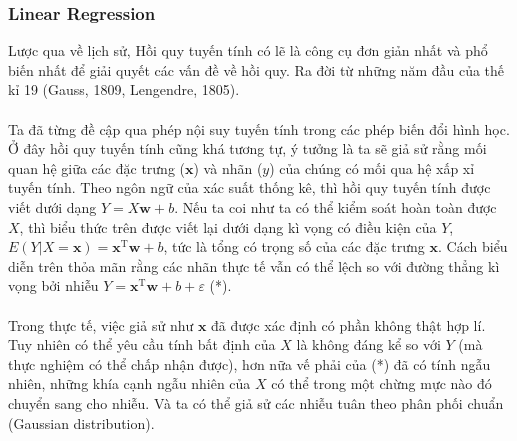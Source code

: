 \documentclass{article}
\begin{document}
\subsubsection{Linear Regression}
Lược qua về lịch sử, Hồi quy tuyến tính có lẽ là công cụ đơn giản nhất và phổ biến nhất để giải quyết các vấn đề về hồi quy. Ra đời từ những năm đầu của thế kỉ 19 (Gauss, 1809, Lengendre, 1805).\\\\
Ta đã từng đề cập qua phép nội suy tuyến tính trong các phép biến đổi hình học. Ở đây hồi quy tuyến tính cũng khá tương tự, ý tưởng là ta sẽ giả sử rằng mối quan hệ giữa các đặc trưng ($\textbf{x}$) và nhãn ($y$) của chúng có mối qua hệ xấp xỉ tuyến tính. Theo ngôn ngữ của xác suất thống kê, thì hồi quy tuyến tính được viết dưới dạng $Y = X\textbf{w}+b$. Nếu ta coi như ta có thể kiểm soát hoàn toàn được $X$, thì biểu thức trên được viết lại dưới dạng kì vọng có điều kiện của $Y$, $E(Y|X=\textbf{x}) = \textbf{x}^{\text{T}}\textbf{w}+b$, tức là tổng có trọng số của các đặc trưng $\textbf{x}$. Cách biểu diễn trên thỏa mãn rằng các nhãn thực tế vẫn có thể lệch so với đường thẳng kì vọng bởi nhiễu $Y = \textbf{x}^{\text{T}}\textbf{w}+b+\varepsilon$ (*).
\\\\
Trong thực tế, việc giả sử như $\textbf{x}$ đã được xác định có phần không thật hợp lí. Tuy nhiên có thể yêu cầu tính bất định của $X$ là không đáng kể so với $Y$ (mà thực nghiệm có thể chấp nhận được), hơn nữa vế phải của (*) đã có tính ngẫu nhiên, những khía cạnh ngẫu nhiên của $X$ có thể trong một chừng mực nào đó chuyển sang cho nhiễu. Và ta có thể giả sử các nhiễu tuân theo phân phối chuẩn (Gaussian distribution).
\end{document}
